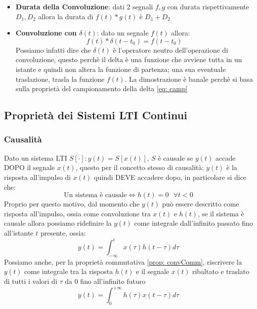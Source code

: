 \begin{itemize}
    \item \textbf{Durata della Convoluzione}: dati 2 segnali $f,g$ con durata rispettivamente $D_1,D_2$ allora la durata di $f(t) \ast g(t)$ è $D_1 + D_2$
    
    \item \textbf{Convoluzione con $\delta(t)$}: dato un segnale $f(t)$ allora:
    \begin{equation}
        f(t) \ast \delta(t - t_0) = f(t - t_0)
    \end{equation}
    Possiamo infatti dire che $\delta(t)$ è l'operatore neutro dell'operazione di convoluzione, questo perchè il delta è una funzione che avviene tutta in un istante e quindi non altera la funzione di partenza; una sua eventuale traslazione, trasla la funzione $f(t)$.
    La dimostrazione è banale perchè si basa sulla proprietà del campionamento della delta \eqref{eq: camp}
\end{itemize}


\newpage

\subsection{Proprietà dei Sistemi LTI Continui}
\subsubsection{Causalità} \label{prop: causalita}
Dato un sistema LTI $S[\cdot] : y(t) = S[x(t)]$, $S$ è causale se $y(t)$ accade DOPO il segnale $x(t)$, questo per il concetto stesso di causalità:
$y(t)$ è la risposta all'impulso di $x(t)$ quindi DEVE accadere dopo, in particolare si dice che:\\
\begin{equation}
    \mbox{Un sistema è causale} \Longleftrightarrow h(t) = 0 \mbox{  } \forall t < 0
\end{equation}
Proprio per questo motivo, dal momento che $y(t)$ può essere descritto come risposta all'impulso, ossia come convoluzione tra $x(t)$ e $h(t)$, se 
il sistema è causale allora possiamo ridefinire la $y(t)$ come integrale dall'infinito passato fino all'istante $t$ presente, ossia:
\begin{equation}
    y(t) = \int_{-\infty}^{t} x(\tau) h(t - \tau) d\tau
\end{equation}
Possiamo anche, per la proprietà commutativa \eqref{prop: convComm}, riscrivere la $y(t)$ come integrale tra la risposta $h(t)$ e il segnale $x(t)$ ribaltato e traslato
di tutti i valori di $\tau$ da 0 fino all'infinito futuro
\begin{equation}
    y(t) = \int_{0}^{+\infty} h(\tau)x(t - \tau) d\tau
\end{equation}

